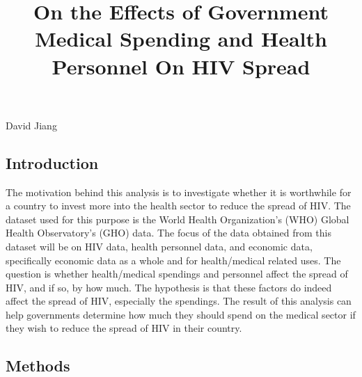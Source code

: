 \documentclass[
  letterpaper,
  DIV=11,
  numbers=noendperiod]{scrartcl}
\title{On the Effects of Government Medical Spending and Health
Personnel On HIV Spread}
\author{}
\date{}
\begin{document}
\maketitle


David Jiang

\subsection{Introduction}\label{introduction}

The motivation behind this analysis is to investigate whether it is
worthwhile for a country to invest more into the health sector to reduce
the spread of HIV. The dataset used for this purpose is the World Health
Organization's (WHO) Global Health Observatory's (GHO) data. The focus
of the data obtained from this dataset will be on HIV data, health
personnel data, and economic data, specifically economic data as a whole
and for health/medical related uses. The question is whether
health/medical spendings and personnel affect the spread of HIV, and if
so, by how much. The hypothesis is that these factors do indeed affect
the spread of HIV, especially the spendings. The result of this analysis
can help governments determine how much they should spend on the medical
sector if they wish to reduce the spread of HIV in their country.

\subsection{Methods}\label{methods}
\end{document}

